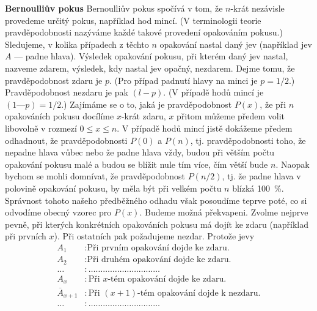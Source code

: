\wikitextrule
\begin{example}\label{mai:exam057}
  \textbf{Bernoulliův pokus}\newline\small
  Bernoulliův pokus spočívá v tom, že \(n\)-krát nezávisle provedeme určitý pokus, například hod 
  mincí. (V terminologii teorie pravděpodobnosti nazýváme každé takové provedení opakováním 
  pokusu.) Sledujeme, v kolika případech z těchto \(n\) opakování nastal daný jev (například jev 
  \(A\) — padne hlava). Výsledek opakování pokusu, při kterém daný jev nastal, nazveme zdarem, 
  výsledek, kdy nastal jev opačný, nezdarem. Dejme tomu, že pravděpodobnost zdaru je \(p\). (Pro 
  případ padnutí hlavy na minci je \(p = 1/2\).) Pravděpodobnost nezdaru je pak \((l - p)\).
  (V případě hodů mincí je \((1 — p) = 1/2\).) Zajímáme se o to, jaká je pravděpodobnost \(P(x)\), 
  že při \(n\) opakováních pokusu docílíme \(x\)-krát zdaru, \(x\) přitom můžeme předem volit 
  libovolně v rozmezí \(0 \leq x \leq n\). V případě hodů mincí jistě dokážeme předem odhadnout, 
  že pravděpodobnosti \(P(0)\) a \(P(n)\), tj. pravděpodobnosti toho, že nepadne hlava vůbec nebo 
  že padne hlava vždy, budou při větším počtu opakování pokusu malé a budou se blížit nule tím 
  více, čím větší bude \(n\). Naopak bychom se mohli domnívat, že pravděpodobnost \(P(n/2)\), 
  tj. že padne hlava v polovině opakování pokusu, by měla být při velkém počtu \(n\) blízká 
  \SI{100}{\percent}. Správnost tohoto našeho předběžného odhadu však posoudíme teprve poté, co si 
  odvodíme obecný vzorec pro \(P(x)\). Budeme možná překvapeni. Zvolme nejprve pevně, při kterých 
  konkrétních opakováních pokusu má dojít ke zdaru  (například při prvních \(x\)). Při ostatních 
  pak požadujeme nezdar. Protože jevy
  \begin{align*}
    A_1                &: \text{Při prvním opakování dojde ke zdaru.}                  \\
    A_2                &: \text{Při druhém opakování dojde ke zdaru.}                  \\
    \ldots             &: \ldots\ldots\ldots\ldots\ldots\ldots\ldots\ldots\ldots\ldots \\
    A_x                &: \text{Při \(x\)-tém opakování dojde ke zdaru.}               \\
    \overline{A}_{x+1} &: \text{Při \((x + 1)\)-tém opakování dojde k nezdaru.}        \\
    \ldots             &: \ldots\ldots\ldots\ldots\ldots\ldots\ldots\ldots\ldots\ldots \\

\end{align*}
\end{example}
